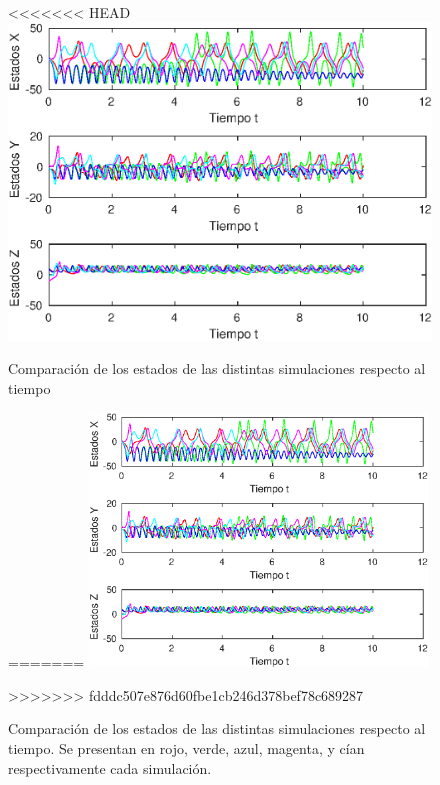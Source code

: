 \documentclass[12pt,letterpaper]{article}
\begin{document}

\begin{figure}
	\centering
<<<<<<< HEAD
	\includegraphics[width=\textwidth]{pictures/comparacion}
	\caption{Comparación de los estados de las distintas simulaciones respecto al tiempo}
=======
	\includegraphics[width=0.8\textwidth]{pictures/comparacion}
	\caption{Comparación de los estados de las distintas simulaciones respecto al tiempo. Se presentan en rojo, verde, azul, magenta, y cían respectivamente cada simulación.}
>>>>>>> fdddc507e876d60fbe1cb246d378bef78c689287
	\label{fig:comparacion}
\end{figure}
\end{document}
